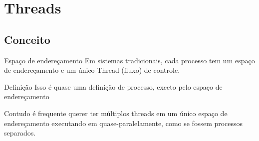 \documentclass[11pt]{beamer}
\begin{document}
\section{Threads}
\subsection*{Conceito}

\begin{frame}{Espaço de endereçamento}
 Em sistemas tradicionais, cada processo tem um espaço de endereçamento e um único Thread (fluxo) de controle.
 \begin{block}{Definição}
 	Isso é quase uma definição de processo, exceto pelo espaço de endereçamento
 \end{block}
 Contudo é frequente querer ter múltiplos threads em um único espaço de endereçamento executando em quase-paralelamente, como se fossem processos separados.
\end{frame}
\end{document}
